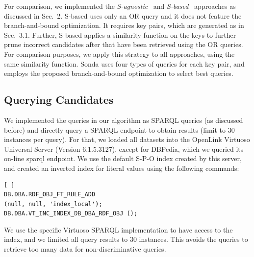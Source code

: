 For comparison, we implemented the \emph{S-agnostic}~\cite{papadakis_efficient_2011} and \emph{S-based}~\cite{DBLP:conf/semweb/SongH11} approaches as discussed in Sec.~2. S-based uses only an OR query and it does not feature the branch-and-bound optimization. It requires key pairs, which are generated as in Sec.~3.1. Further, S-based applies a similarity function on the keys to further prune incorrect candidates after that have been retrieved using the OR queries. For comparison purposes, we apply this strategy to all approaches, using the same similarity function. Sonda uses four types of queries for each key pair, and employs the proposed branch-and-bound optimization to select best queries. 

\subsection{Querying Candidates} 
We implemented the queries in our algorithm as SPARQL queries (as discussed before) and directly query a SPARQL endpoint to obtain results (limit to 30 instances per query). For that, we loaded all datasets into the OpenLink Virtuoso Universal Server (Version 6.1.5.3127), except for DBPedia, which we queried its on-line sparql endpoint. We use the default S-P-O index created by this server, and created an inverted index for literal values using the following commands:

\lstset{basicstyle=\small}
\begin{lstlisting}[ ]   
DB.DBA.RDF_OBJ_FT_RULE_ADD 
(null, null, 'index_local');
DB.DBA.VT_INC_INDEX_DB_DBA_RDF_OBJ (); 
\end{lstlisting}

We use the specific Virtuoso SPARQL implementation to have access to the index, and we limited all query results to 30 instances. This avoids the queries to retrieve too many data for non-discriminative queries.

